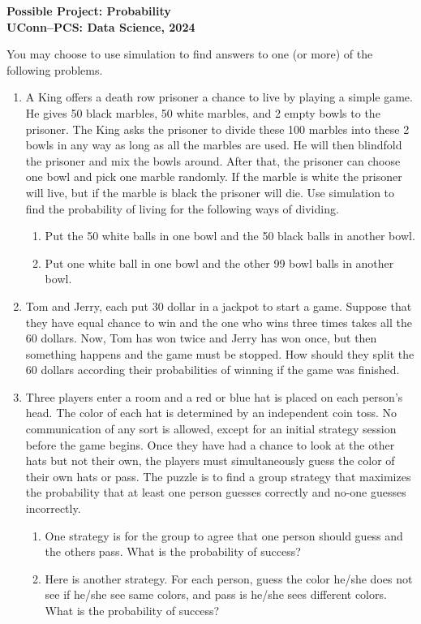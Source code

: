 \documentclass[12pt]{article}
\begin{document}
\begin{center}
  \bf Possible Project: Probability\\
  UConn--PCS: Data Science, 2024\\
\end{center}

You may choose to use simulation to find answers to one (or more) of the
following problems.

\begin{enumerate}[1.]
\item A King offers a death row prisoner a chance to live by playing a simple
  game. He gives 50 black marbles, 50 white marbles, and 2 empty bowls to the
  prisoner. The King asks the prisoner to divide these 100 marbles into these 2
  bowls in any way as long as all the marbles are used. He will then blindfold
  the prisoner and mix the bowls around. After that, the prisoner can choose one
  bowl and pick one marble randomly.  If the marble is white the prisoner will
  live, but if the marble is black the prisoner will die. Use simulation to find
  the probability of living for the following ways of dividing.
  \begin{enumerate}
  \item Put the 50 white balls in one bowl and the 50 black balls in another
    bowl.
  \item Put one white ball in one bowl and the other 99 bowl balls in another
    bowl.
  \end{enumerate}
  
\item Tom and Jerry, each put 30 dollar in a jackpot to start a game. Suppose
  that they have equal chance to win and the one who wins three times takes all
  the 60 dollars. Now, Tom has won twice and Jerry has won once, but then
  something happens and the game must be stopped. How should they split the 60
  dollars according their probabilities of winning if the game was finished.

\item Three players enter a room and a red or blue hat is placed on each
  person's head.  The color of each hat is determined by an independent coin
  toss. No communication of any sort is allowed, except for an initial strategy
  session before the game begins.  Once they have had a chance to look at the
  other hats but not their own, the players must simultaneously guess the
  color of their own hats or pass. The puzzle is to find a group strategy that
  maximizes the probability that at least one person guesses correctly and
  no-one guesses incorrectly.
  \begin{enumerate}
  \item One strategy is for the group to agree that one person should guess and
    the others pass. What is the probability of success?
  \item Here is another strategy. For each person, guess the color he/she does
    not see if he/she see same colors, and pass is he/she sees different
    colors. What is the probability of success?
  \end{enumerate}
  

\end{enumerate}
\end{document}

